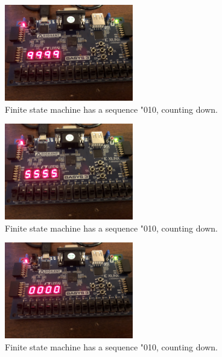 \documentclass[11pt]{article}
\begin{document}
\begin{figure}[H]
\begin{center}
	\includegraphics[width=0.5\textwidth]{./images/p3/IMG_1016.jpg}
	\caption{\label{fig:int_res4}Finite state machine has a sequence "010, counting down.}
\end{center}
\end{figure}

\begin{figure}[H]
\begin{center}
	\includegraphics[width=0.5\textwidth]{./images/p3/IMG_1015.jpg}
	\caption{\label{fig:int_res5}Finite state machine has a sequence "010, counting down.}
\end{center}
\end{figure}

\begin{figure}[H]
\begin{center}
	\includegraphics[width=0.5\textwidth]{./images/p3/IMG_1014.jpg}
	\caption{\label{fig:int_res6}Finite state machine has a sequence "010, counting down.}
\end{center}
\end{figure}
\end{document}
